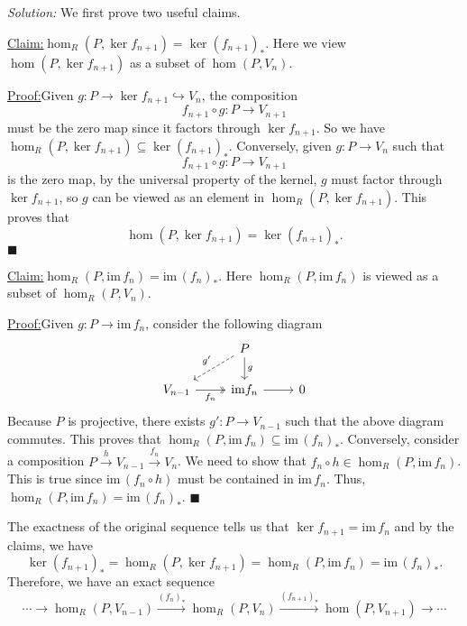 \documentclass[a4paper, 12pt]{article}
\newenvironment{solution}
    {\textit{Solution:}}
    {}
\newenvironment{claim}[1]{\par\noindent\underline{Claim:}\space#1}{}
\newenvironment{claimproof}[1]{\par\noindent\underline{Proof:}\space#1}{\hfill $\blacksquare$}
\newcommand{\im}{\text{im}\,}
\begin{document}
\begin{solution}
We first prove two useful claims.
\begin{claim}
\(\hom_R(P,\ker f_{n+1})=\ker (f_{n+1})_*\). Here we view \(\hom(P,\ker f_{n+1})\) as a subset of \(\hom(P,V_n)\).
\end{claim}
\begin{claimproof}
Given \(g:P\rightarrow \ker f_{n+1}\hookrightarrow V_n\), the composition 
\[f_{n+1}\circ g:P\rightarrow V_{n+1}\]
must be the zero map since it factors through \(\ker f_{n+1}\). So we have \(\hom_R(P,\ker f_{n+1})\subseteq \ker (f_{n+1})_*\). Conversely, given \(g:P\rightarrow V_n\) such that 
\[f_{n+1}\circ g:P\rightarrow V_{n+1}\] 
is the zero map, by the universal property of the kernel, \(g\) must factor through \(\ker f_{n+1}\), so \(g\) can be viewed as an element in \(\hom_R(P,\ker f_{n+1})\). This proves that 
\[\hom(P,\ker f_{n+1})=\ker (f_{n+1})_*.\]
\end{claimproof}
\begin{claim}
\(\hom_R(P,\im f_n)=\im (f_n)_*\). Here \(\hom_R(P,\im f_n)\) is viewed as a subset of \(\hom_R(P,V_n)\).
\end{claim}
\begin{claimproof}
Given \(g:P\rightarrow \im f_n\), consider the following diagram 
\[\begin{tikzcd}
	& P \\
	{V_{n-1}} & {\text{im}f_n} & 0
	\arrow["{g'}"', dashed, from=1-2, to=2-1]
	\arrow["g", from=1-2, to=2-2]
	\arrow["{f_n}"', two heads, from=2-1, to=2-2]
	\arrow[from=2-2, to=2-3]
\end{tikzcd}\]
Because \(P\) is projective, there exists \(g':P\rightarrow V_{n-1}\) such that the above diagram commutes. 
This proves that \(\hom_R(P,\im f_n)\subseteq \im (f_n)_*\). Conversely, consider a composition \(P\xrightarrow{h}V_{n-1}\xrightarrow{f_n}V_n\). We need to show that \(f_n\circ h\in \hom_R(P,\im f_n)\). This is true since 
\(\im(f_n\circ h)\) must be contained in \(\im f_n\). Thus, \(\hom_R(P,\im f_n)=\im (f_n)_*\).
\end{claimproof}

The exactness of the original sequence tells us that \(\ker f_{n+1}=\im f_n\) and by the claims, we have 
\[\ker(f_{n+1})_*= \hom_R(P,\ker f_{n+1})=\hom_R(P, \im f_n)=\im (f_n)_*.\]
Therefore, we have an exact sequence 
\[\cdots\rightarrow\hom_R(P,V_{n-1})\xrightarrow{(f_n)_*}\hom_R(P,V_n)\xrightarrow{(f_{n+1})_*}\hom(P,V_{n+1})\rightarrow\cdots\]
\end{solution}
\end{document}

